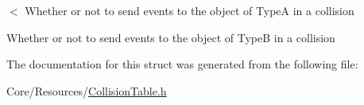 $<$ Whether or not to send events to the object of Type\-A in a collision 

Whether or not to send events to the object of Type\-B in a collision 

The documentation for this struct was generated from the following file\-:\begin{DoxyCompactItemize}
\item 
Core/\-Resources/\hyperlink{CollisionTable_8h}{Collision\-Table.\-h}\end{DoxyCompactItemize}
